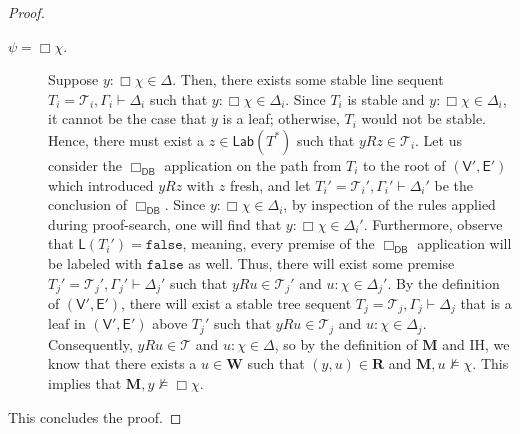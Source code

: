 \documentclass[copyright,creativecommons]{eptcs}
\newcommand{\tel}{\mathcal{T}}
\newcommand{\lab}{\mathsf{Lab}}
\newcommand{\sar}{\vdash}
\newcommand{\tseq}{T} %
\newcommand{\false}{\mathtt{false}}
\newcommand{\ndrule}{\Box_\mathsf{DB}}
\newcommand{\ctv}{\mathsf{V}}
\newcommand{\cte}{\mathsf{E}}
\newcommand{\ctl}{\mathsf{L}}
\newcommand{\fval}{\false} %
\newcommand{\M}{\mathbf{M}}
\newcommand{\W}{\mathbf{W}}
\newcommand{\R}{\mathbf{R}}
\begin{document}
\begin{proof}
\begin{description}
\item[$\psi = \Box \chi.$] Suppose $y : \Box \chi \in \Delta$. Then, there exists some stable line sequent $\tseq_{i} = \tel_{i}, \Gamma_{i} \sar \Delta_{i}$ such that $y : \Box \chi \in \Delta_{i}$. Since $\tseq_{i}$ is stable and $y : \Box \chi \in \Delta_{i}$, it cannot be the case that $y$ is a leaf; otherwise, $\tseq_{i}$ would not be stable. Hence, there must exist a $z \in \lab(\tseq^{*})$ such that $yRz \in \tel_{i}$. Let us consider the $\ndrule$ application on the path from $\tseq_{i}$ to the root of $(\ctv',\cte')$ which introduced $yRz$ with $z$ fresh, and let $\tseq_{i}' = \tel_{i}', \Gamma_{i}' \sar \Delta_{i}'$ be the conclusion of $\ndrule$. Since $y : \Box \chi \in \Delta_{i}$, by inspection of the rules applied during proof-search, one will find that $y : \Box \chi \in \Delta_{i}'$. Furthermore, observe that $\ctl(\tseq_{i}') = \fval$, meaning, every premise of the $\ndrule$ application will be labeled with $\fval$ as well. Thus, there will exist some premise $\tseq_{j}' = \tel_{j}', \Gamma_{j}' \sar \Delta_{j}'$ such that $yRu \in \tel_{j}'$ and $u : \chi \in \Delta_{j}'$. By the definition of $(\ctv',\cte')$, there will exist a stable tree sequent $\tseq_{j} = \tel_{j}, \Gamma_{j} \sar \Delta_{j}$ that is a leaf in $(\ctv',\cte')$ above $\tseq_{j}'$ such that $yRu \in \tel_{j}$ and $u : \chi \in \Delta_{j}$. Consequently, $yRu \in \tel$ and $u : \chi \in \Delta$, so by the definition of $\M$ and IH, we know that there exists a $u \in \W$ such that $(y,u) \in \R$ and $\M, u \not\models \chi$. This implies that $\M, y \not\models \Box \chi$.

\end{description}
This concludes the proof.
\end{proof}
\fi
\end{document}
